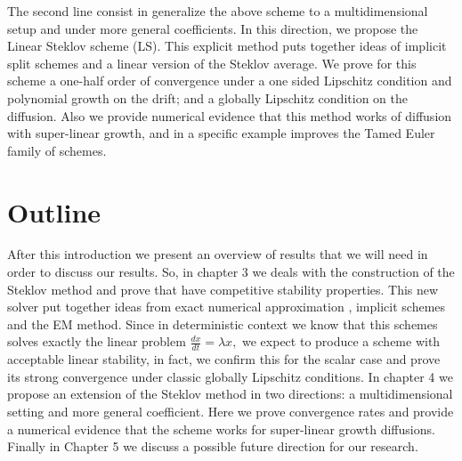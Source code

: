		The second line consist in generalize the above scheme to a multidimensional setup and under more general 
	coefficients. In this direction, we propose the Linear Steklov scheme (LS). This explicit method puts together 
	ideas of implicit split schemes and a linear version of the Steklov average. We prove for this scheme a one-half 
	order of convergence under a one sided Lipschitz condition and polynomial growth on the drift; and a globally 
	Lipschitz condition on the diffusion. Also we provide numerical evidence that this method works of diffusion with 
	super-linear growth, and in a specific example improves the Tamed Euler family of schemes. 
	 
\section{Outline}
		After this introduction we present an overview of results that we will need in order to discuss our 
	results. So, in chapter 3 we deals with the construction of the Steklov method and prove that have competitive
	stability properties.	This new solver put together ideas from exact numerical 
	approximation \cite{Matus2005}, implicit schemes and the EM method. Since in deterministic context we know that
	this schemes solves exactly the linear problem 
	$
		\frac{dx}{dt} = \lambda x,
	$
	we expect to produce a scheme with acceptable linear stability, in fact, we confirm this for the scalar case
	and prove its strong convergence under classic globally Lipschitz conditions. 
	In chapter 4 we propose an extension of the Steklov method in two directions:
	a multidimensional setting and more general coefficient. Here we prove convergence rates and provide a 
	numerical evidence that the scheme works for super-linear growth diffusions. 
	Finally in Chapter 5 we discuss a possible future direction for our research.